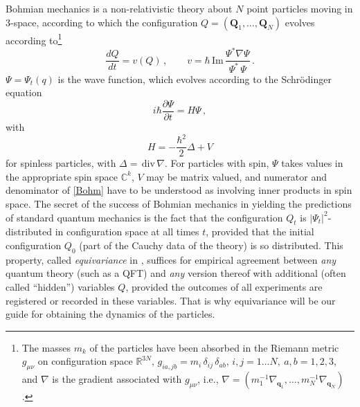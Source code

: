 \documentclass[12pt]{article}
\newcommand{\CCC}{\mathbb{C}} %
\newcommand{\RRR}{\mathbb{R}} %
\newcommand{\I}{i} %
\newcommand{\1}{\mathbf{1}} %
\newcommand{\Laplace}{\Delta} %
\renewcommand{\Im}{\mathrm{Im}} %
\renewcommand{\div}{\,\mathrm{div}\,} %
\newcommand{\vq}{{\boldsymbol q}}
\newcommand{\vQ}{{\boldsymbol Q}}
\begin{document}
Bohmian mechanics \cite{Bohm52,DGZ,Stanford} is a non-relativistic
theory about $N$ point particles moving in 3-space, according to which
the configuration $Q=(\vQ_1,\ldots,\vQ_N)$ evolves according
to\footnote{ The masses $m_k$ of the particles have been absorbed in
the Riemann metric $g_{\mu\nu}$ on configuration space $\RRR^{3N}$,
$g_{ia,jb} = m_i \, \delta_{ij}\, \delta_{ab}$, $i,j=1\ldots N, \:
a,b=1,2,3$, and $\nabla$ is the gradient associated with $g_{\mu\nu}$,
i.e., $\nabla =(m_1^{-1}\nabla_{\vq_1}, \dots,
m_N^{-1}\nabla_{\vq_N})$.}
\begin{equation}\label{Bohm}
    \frac{dQ}{dt} = v(Q)\,,\qquad
    v=\hbar \, \Im \, \frac{\Psi^* \nabla\Psi} {\Psi^* \, \Psi}\,.
\end{equation}
$\Psi=\Psi_t(q)$ is the wave function, which
evolves according to the Schr\"odinger equation
\begin{equation}\label{Seq}
    \I\hbar\frac{\partial\Psi}{\partial t} = H \Psi\,,
\end{equation}
with
\begin{equation}\label{Hamil}
     H=  -\frac{\hbar^2}{2} \Laplace + V
\end{equation}
for spinless particles, with $\Laplace = \div\nabla$. For particles
with spin, $\Psi$ takes values in the appropriate spin space $\CCC^k$,
$V$ may be matrix valued, and numerator and denominator of
\eqref{Bohm} have to be understood as involving inner products in spin
space. The secret of the success of Bohmian mechanics in yielding the
predictions of standard quantum mechanics is the fact that the
configuration $Q_t$ is $|\Psi_t|^2$-distributed in configuration space
at all times $t$, provided that the initial configuration $Q_0$ (part
of the Cauchy data of the theory) is so distributed.  This property,
called \emph{equivariance} in \cite{DGZ}, suffices for empirical
agreement between \emph{any} quantum theory (such as a QFT) and
\emph{any} version thereof with additional (often called ``hidden'')
variables $Q$, provided the outcomes of all experiments are registered
or recorded in these variables. That is why equivariance will be our
guide for obtaining the dynamics of the particles.
\end{document}
